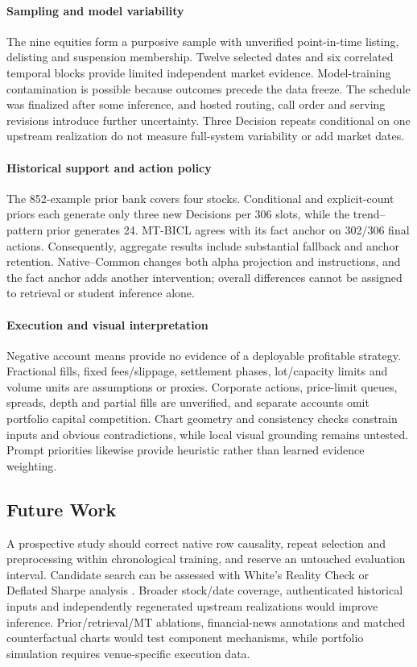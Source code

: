 \paragraph{Sampling and model variability}
The nine equities form a purposive sample with unverified point-in-time listing, delisting and suspension membership. Twelve selected dates and six correlated temporal blocks provide limited independent market evidence. Model-training contamination is possible because outcomes precede the data freeze. The schedule was finalized after some inference, and hosted routing, call order and serving revisions introduce further uncertainty. Three Decision repeats conditional on one upstream realization do not measure full-system variability or add market dates.

\paragraph{Historical support and action policy}
The 852-example prior bank covers four stocks. Conditional and explicit-count priors each generate only three new Decisions per 306 slots, while the trend--pattern prior generates 24. MT-BICL agrees with its fact anchor on 302/306 final actions. Consequently, aggregate results include substantial fallback and anchor retention. Native--Common changes both alpha projection and instructions, and the fact anchor adds another intervention; overall differences cannot be assigned to retrieval or student inference alone.

\paragraph{Execution and visual interpretation}
Negative account means provide no evidence of a deployable profitable strategy. Fractional fills, fixed fees/slippage, settlement phases, lot/capacity limits and volume units are assumptions or proxies. Corporate actions, price-limit queues, spreads, depth and partial fills are unverified, and separate accounts omit portfolio capital competition. Chart geometry and consistency checks constrain inputs and obvious contradictions, while local visual grounding remains untested. Prompt priorities likewise provide heuristic rather than learned evidence weighting.

\subsection{Future Work}
A prospective study should correct native row causality, repeat selection and preprocessing within chronological training, and reserve an untouched evaluation interval. Candidate search can be assessed with White's Reality Check or Deflated Sharpe analysis \cite{white2000reality,bailey2014deflated}. Broader stock/date coverage, authenticated historical inputs and independently regenerated upstream realizations would improve inference. Prior/retrieval/MT ablations, financial-news annotations and matched counterfactual charts would test component mechanisms, while portfolio simulation requires venue-specific execution data.

